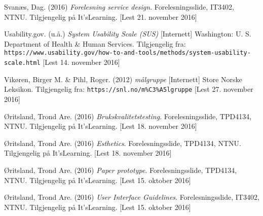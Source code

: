 \begin{thebibliography}{30}
Svanæs, Dag. (2016) \textit{Forelesning service design}. Forelesningsslide, IT3402, NTNU. Tilgjengelig på It’sLearning. [Lest 21. november 2016]

Usability.gov. (u.å.) \textit{System Usability Scale (SUS)} [Internett] Washington: U. S. Department of Health \& Human Services. Tilgjengelig fra: \\ \texttt{https://www.usability.gov/how-to-and-tools/methods/system-usability-scale.html} [Lest 14. november 2016]

Vikøren, Birger M. \& Pihl, Roger. (2012) \textit{målgruppe} [Internett] Store Norske Leksikon. Tilgjengelig fra: \texttt{https://snl.no/m\%C3\%A5lgruppe} [Lest 27. november 2016]

Øritsland, Trond Are. (2016) \textit{Brukskvalitetstesting}. Forelesningsslide, TPD4134, NTNU. Tilgjengelig på It’sLearning. [Lest 18. november 2016]

Øritsland, Trond Are. (2016) \textit{Esthetics}. Forelesningsslide, TPD4134, NTNU. Tilgjengelig på It’sLearning. [Lest 18. november 2016]

Øritsland, Trond Are. (2016) \textit{Paper prototype}. Forelesningsslide, TPD4134, NTNU. Tilgjengelig på It’sLearning. [Lest 15. oktober 2016]

Øritsland, Trond Are. (2016) \textit{User Interface Guidelines}. Forelesningsslide, IT3402, NTNU. Tilgjengelig på It’sLearning. [Lest 15. oktober 2016]

\end{thebibliography}